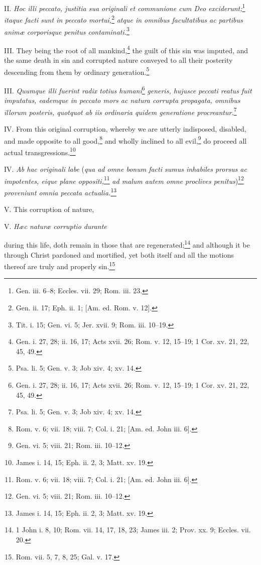 II. \emph{Hoc illi peccato, justitia sua originali et communione cum Deo exciderunt;}\footnote{Gen. iii. 6–8; Eccles. vii. 29; Rom. iii. 23.}\emph{ itaque facti sunt in peccato mortui,}\footnote{Gen. ii. 17; Eph. ii. 1; [Am. ed. Rom. v. 12].}\emph{ atque in omnibus facultatibus ac partibus animæ corporisque penitus contaminati.}\footnote{Tit. i. 15; Gen. vi. 5; Jer. xvii. 9; Rom. iii. 10–19.}

III. They being the root of all mankind,\footnote{Gen. i. 27, 28; ii. 16, 17; Acts xvii. 26; Rom. v. 12, 15–19; 1 Cor. xv. 21, 22, 45, 49.} the guilt of this sin was imputed, and the same death in sin and corrupted nature conveyed to all their posterity descending from them by ordinary generation.\footnote{Psa. li. 5; Gen. v. 3; Job xiv. 4; xv. 14.}

III. \emph{Quumque illi fuerint radix totius humani}\footnote{Gen. i. 27, 28; ii. 16, 17; Acts xvii. 26; Rom. v. 12, 15–19; 1 Cor. xv. 21, 22, 45, 49.}\emph{ generis, hujusce peccati reatus fuit imputatus, eademque in peccato mors ac natura corrupta propagata, omnibus illorum posteris, quotquot ab iis ordinaria quidem generatione procreantur.}\footnote{Psa. li. 5; Gen. v. 3; Job xiv. 4; xv. 14.}

IV. From this original corruption, whereby we are utterly indisposed, disabled, and made opposite to all good,\footnote{Rom. v. 6; vii. 18; viii. 7; Col. i. 21; [Am. ed. John iii. 6].} and wholly inclined to all evil,\footnote{Gen. vi. 5; viii. 21; Rom. iii. 10–12.} do proceed all actual transgressions.\footnote{James i. 14, 15; Eph. ii. 2, 3; Matt. xv. 19.}

IV. \emph{Ab hac originali labe} (\emph{qua ad omne bonum facti sumus inhabiles prorsus ac impotentes, eique plane oppositi,}\footnote{Rom. v. 6; vii. 18; viii. 7; Col. i. 21; [Am. ed. John iii. 6].}\emph{ ad malum autem omne proclives penitus})\footnote{Gen. vi. 5; viii. 21; Rom. iii. 10–12.}\emph{ proveniunt omnia peccata actualia.}\footnote{James i. 14, 15; Eph. ii. 2, 3; Matt. xv. 19.}

V. This corruption of nature,

V. \emph{Hæc naturæ corruptio durante }

during this life, doth remain in those that are regenerated;\footnote{1 John i. 8, 10; Rom. vii. 14, 17, 18, 23; James iii. 2; Prov. xx. 9; Eccles. vii. 20.} and although it be through Christ pardoned and mortified, yet both itself and all the motions thereof are truly and properly sin.\footnote{Rom. vii. 5, 7, 8, 25; Gal. v. 17.}

